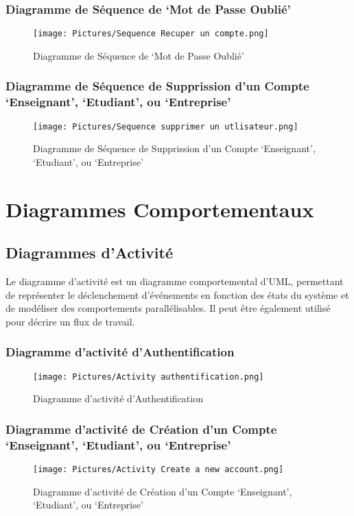 \documentclass[11pt,fleqn]{book} %
\begin{document}
\subsubsection{ Diagramme de Séquence de ‘Mot de Passe Oublié’}
\begin{figure}[h]
    \centering
    \texttt{[image: Pictures/Sequence Recuper un compte.png]}
    \caption{Diagramme de Séquence de ‘Mot de Passe Oublié’}
    \label{fig:pca}
\end{figure}
\newpage
\subsubsection{Diagramme de Séquence de Supprission d’un 
Compte ‘Enseignant’, ‘Etudiant’, ou ‘Entreprise’}
\begin{figure}[h]
    \centering
    \texttt{[image: Pictures/Sequence supprimer un utlisateur.png]}
    \caption{Diagramme de Séquence de Supprission d’un 
Compte ‘Enseignant’, ‘Etudiant’, ou ‘Entreprise’}
    \label{fig:pca}
\end{figure}
\newpage
\section{Diagrammes Comportementaux}
\subsection{Diagrammes d’Activité}
Le diagramme d'activité est un diagramme comportemental d'UML, permettant de représenter le déclenchement d'événements en fonction des états du système et de modéliser des comportements parallélisables. Il peut être également utilisé pour décrire un flux de travail.
\newpage
\subsubsection{Diagramme d’activité d’Authentification}
\begin{figure}[h]
    \centering
    \texttt{[image: Pictures/Activity authentification.png]}
    \caption{Diagramme d’activité d’Authentification}
    \label{fig:pca}
\end{figure}
\newpage
\subsubsection{Diagramme d’activité de Création d’un 
Compte ‘Enseignant’, ‘Etudiant’, ou ‘Entreprise’}
\begin{figure}[h]
    \centering
    \texttt{[image: Pictures/Activity Create a new account.png]}
    \caption{Diagramme d’activité de Création d’un 
Compte ‘Enseignant’, ‘Etudiant’, ou ‘Entreprise’}
    \label{fig:pca}
\end{figure}
\newpage
\end{document}
